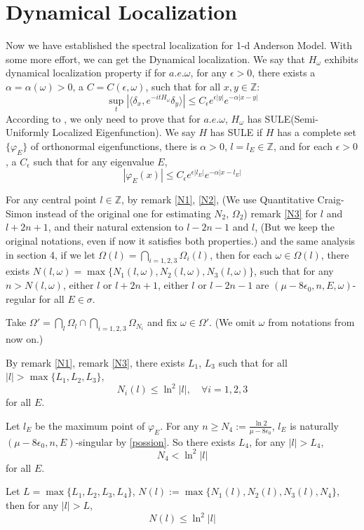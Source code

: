 \section{Dynamical Localization}
Now we have established the spectral localization for 1-d Anderson Model. With some more effort, we can get the Dynamical localization.
We say that $H_\omega$ exhibits dynamical localization property if for $a.e.\omega$, for any $\epsilon>0$, there exists a $\alpha=\alpha(\omega)>0$, a $C=C(\epsilon,\omega)$, such that for all $x,y\in\mathbb{Z}$:
  \[
    \sup_t |\langle\delta_x,e^{-itH_{\omega}}\delta_y\rangle|\leq C_\epsilon e^{\epsilon|y|}e^{-\alpha|x-y|}
  \]
According to \cite{del1996operators}, we only need to prove that for $a.e.\omega$, $H_\omega$ has SULE(Semi-Uniformly Localized Eigenfunction). We say $H$ has SULE if $H$ has a complete set $\{\varphi_E\}$ of orthonormal eigenfunctions, there is $\alpha>0$, $l=l_E\in\mathbb{Z}$, and for each $\epsilon>0$, a $C_\epsilon$ such that for any eigenvalue $E$,
  \[
    |\varphi_E(x)|\leq C_\epsilon e^{\epsilon|l_E|}e^{-\alpha|x-l_E|}
  \]

For any central point $l\in\mathbb{Z}$, by remark \ref{N1}, \ref{N2}, (We use Quantitative Craig-Simon instead of the original one for estimating $N_2$, $\Omega_2$) remark \ref{N3} for $l$ and $l+2n+1$, and their natural extension to $l-2n-1$ and $l$, (But we keep the original notations, even if now it satisfies both properties.) and the same analysis in section 4, if we let $\Omega(l)=\bigcap_{i=1,2,3}\Omega_i(l)$, then for each
 $\omega\in\Omega(l)$, there exists $N(l,\omega) =\max\{N_1(l,\omega),N_2(l,\omega),N_3(l,\omega)\}$,
 such that for any $n>N(l,\omega)$,
 either $l$ or $l+2n+1$, either $l$ or $l-2n-1$ are $(\mu-8\epsilon_0,n,E,\omega)$-regular for all $E\in \sigma$.

 Take $\Omega'=\bigcap\limits_{l}\Omega_l\cap\bigcap_{i=1,2,3}\Omega_{N_i}$ and fix $\omega\in\Omega'$. (We omit $\omega$ from notations from now on.)

By remark \ref{N1}, remark \ref{N3}, there exists $L_1$, $L_3$ such that for all $|l|>\max\{L_1,L_2,L_3\}$,
  \[
    N_i(l)\leq \ln^2 |l|,\quad \forall i=1,2,3
  \]
  for all $E$.

Let $l_E$ be the maximum point of $\varphi_E$.
For any $n\geq N_4:=\frac{\ln 2}{\mu-8\epsilon_0}$, $l_E$ is naturally $(\mu-8\epsilon_0,n,E)$-singular by \eqref{possion}. So there exists $L_4$, for any $|l|>L_4$,
  \[
    N_4<\ln^2 |l|
  \]
for all $E$.

Let $L=\max\{L_1, L_2, L_3, L_4\}$, $N(l):=\max\{N_1(l),N_2(l),N_3(l),N_4\}$, then for any $|l|>L$,
\begin{equation}\label{Nl}
  N(l)\leq \ln^2 |l|
\end{equation}

